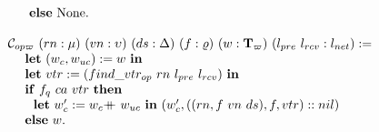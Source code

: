 \begin{figure}
$$\begin{array}{ll}
\ \ \ \ \  \mbox{\textbf{else}} \  \text{None}.\\
\\
\opwcons\ (rn: \termnum)\ (vn :\seqnum)\ (ds : \dsvalue)\ (f: \updatefunc)\ (w :\witnesstree)\ (l_{pre}\ l_{rcv}: \networklog) := \\
 \ \ \ \ \mbox{\textbf{let}}\ (w_c, w_{uc}) := w\  \mbox{\textbf{in}} \\ 
\ \ \ \ \mbox{\textbf{let}}\ vtr := (find\_vtr_{op} \ rn \ l_{pre} \ l_{rcv})\  \mbox{\textbf{in}} \\ 
\ \ \ \ \mbox{\textbf{if}} \ f_{q} \ ca \ vtr \ \mbox{\textbf{then}}  \\
\ \ \ \ \ \  \mbox{\textbf{let}}\ w_c' := w_c \doubleplus w_{uc} \  \mbox{\textbf{in}} \ (w_c',  ((rn, f\ vn \ ds), f, vtr)::nil)\\
\ \ \ \ \mbox{\textbf{else}}  \ w.\\
\end{array}
$$
%

\end{figure}
